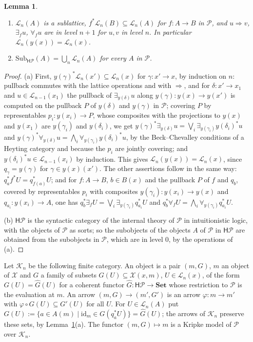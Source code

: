 \documentclass[11pt]{amsart}
\newtheorem{lem}[thm]{Lemma}
\theoremstyle{definition}
\newcommand{\Set}{\mathbf{Set}}
\newcommand{\Sub}{\mathrm{Sub}}
\newcommand{\HH}{\mathsf H}
\newcommand{\cK}{\mathcal K}
\begin{document}
\begin{lem}\label{lem:levels}
\begin{enumerate}
\item[(a)] $\mathcal L_n(A)$ is a sublattice, $f^*\mathcal L_n(B)
\subseteq\mathcal L_n(A)$ for $f\colon A\to B$ in $\mathcal P$, and
$u\Rightarrow v$, $\exists_fu$, $\forall_fu$ are in level $n+1$ for
$u,v$ in level $n$. In particular $\mathcal L_n(y(x))=\mathcal L_n(x)$.
\item[(b)] $\Sub_{\HH\mathcal P}(A)=\bigcup_n\mathcal L_n(A)$ for every
$A$ in $\mathcal P$.
\end{enumerate}
\end{lem}
\begin{proof}
(a) First, $y(\gamma)^*\mathcal L_n(x')\subseteq\mathcal L_n(x)$ for
$\gamma\colon x'\to x$, by induction on $n$: pullback commutes with the
lattice operations and with $\Rightarrow$, and for $\delta\colon x'\to
x_1$ and $u\in\mathcal L_{n-1}(x_1)$ the pullback of
$\exists_{y(\delta)}u$ along $y(\gamma)\colon y(x)\to y(x')$ is
computed on the pullback $P$ of $y(\delta)$ and $y(\gamma)$ in
$\mathcal P$; covering $P$ by representables $p_i\colon y(x_i)\to P$,
whose composites with the projections to $y(x)$ and $y(x_1)$ are
$y(\gamma_i)$ and $y(\delta_i)$, we get
$y(\gamma)^*\exists_{y(\delta)}u=\bigvee_i\exists_{y(\gamma_i)}
y(\delta_i)^*u$ and $y(\gamma)^*\forall_{y(\delta)}u=\bigwedge_i
\forall_{y(\gamma_i)}y(\delta_i)^*u$, by the Beck--Chevalley conditions
of a Heyting category and because the $p_i$ are jointly covering; and
$y(\delta_i)^*u\in\mathcal L_{n-1}(x_i)$ by induction. This
gives $\mathcal L_n(y(x))=\mathcal L_n(x)$, since $q_\gamma=y(\gamma)$
for $\gamma\in y(x)(x')$. The other assertions follow in the same way:
$q_a^*f^*U=q_{f(a)}^*U$; and for $f\colon A\to B$, $b\in B(x)$ and the
pullback $P$ of $f$ and $q_b$, covered by representables $p_i$ with
composites $y(\gamma_i)\colon y(x_i)\to y(x)$ and $q_{a_i}\colon
y(x_i)\to A$, one has $q_b^*\exists_fU=\bigvee_i\exists_{y(\gamma_i)}
q_{a_i}^*U$ and $q_b^*\forall_fU=\bigwedge_i\forall_{y(\gamma_i)}
q_{a_i}^*U$.

(b) $\HH\mathcal P$ is the syntactic category of the internal theory of
$\mathcal P$ in intuitionistic logic, with the objects of $\mathcal P$
as sorts; so the subobjects of the objects $A$ of $\mathcal P$ in
$\HH\mathcal P$ are obtained from the subobjects in $\mathcal P$, which
are in level $0$, by the operations of (a).
\end{proof}

Let $\cK_n$ be the following finite category. An object is a pair
$(m,G)$, $m$ an object of $\mathcal X$ and $G$ a family of subsets
$G(U)\subseteq\mathcal X(x,m)$, $U\in\mathcal L_n(x)$, of the form
$G(U)=\hat G(U)$ for a coherent functor $\hat G\colon\HH\mathcal P\to
\Set$ whose restriction to $\mathcal P$ is the evaluation at $m$. An
arrow $(m,G)\to(m',G')$ is an arrow $\varphi\colon m\to m'$ with
$\varphi\circ G(U)\subseteq G'(U)$ for all $U$. For $U\in\mathcal L_n
(A)$ put $G(U):=\{a\in A(m)\mid\mathrm{id}_m\in G(q_a^*U)\}=\hat G(U)$;
the arrows of $\cK_n$ preserve these sets, by Lemma~\ref{lem:levels}(a).
The functor $(m,G)\mapsto m$ is a Kripke model of $\mathcal P$ over
$\cK_n$.
\end{document}
